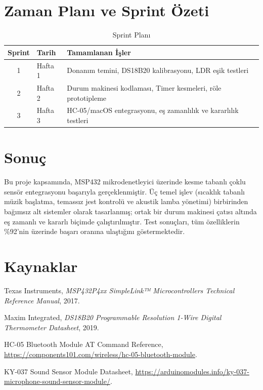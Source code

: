 \documentclass[12pt, a4paper]{article}
\begin{document}
\section{Zaman Planı ve Sprint Özeti}

\begin{table}[H]
  \centering
  \caption{Sprint Planı}
  \begin{tabular}{clp{8cm}}
    \toprule
    \textbf{Sprint} & \textbf{Tarih} & \textbf{Tamamlanan İşler} \\
    \midrule
    1 & Hafta 1 & Donanım temini, DS18B20 kalibrasyonu, LDR eşik testleri \\
    2 & Hafta 2 & Durum makinesi kodlaması, Timer kesmeleri, röle prototipleme \\
    3 & Hafta 3 & HC-05/macOS entegrasyonu, eş zamanlılık ve kararlılık testleri \\
    \bottomrule
  \end{tabular}
\end{table}

\section{Sonuç}

Bu proje kapsamında, MSP432 mikrodenetleyici üzerinde kesme tabanlı çoklu sensör
entegrasyonu başarıyla gerçeklenmiştir. Üç temel işlev (sıcaklık tabanlı müzik
başlatma, temassız jest kontrolü ve akustik lamba yönetimi) birbirinden bağımsız
alt sistemler olarak tasarlanmış; ortak bir durum makinesi çatısı altında
eş zamanlı ve kararlı biçimde çalıştırılmıştır. Test sonuçları, tüm özelliklerin
\%92'nin üzerinde başarı oranına ulaştığını göstermektedir.

\section*{Kaynaklar}

\begin{enumerate}[label={[\arabic*]}]
  \item Texas Instruments, \textit{MSP432P4xx SimpleLink™ Microcontrollers Technical Reference Manual}, 2017.
  \item Maxim Integrated, \textit{DS18B20 Programmable Resolution 1-Wire Digital Thermometer Datasheet}, 2019.
  \item HC-05 Bluetooth Module AT Command Reference, \url{https://components101.com/wireless/hc-05-bluetooth-module}.
  \item KY-037 Sound Sensor Module Datasheet, \url{https://arduinomodules.info/ky-037-microphone-sound-sensor-module/}.
\end{enumerate}
\end{document}
